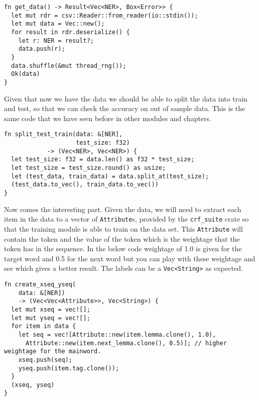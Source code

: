 \documentclass{book}
\begin{document}
\begin{lstlisting}[caption={chapter5\\/crfsuite\\-model\\/src\\/main\\.rs}, basicstyle=\small]
fn get_data() -> Result<Vec<NER>, Box<Error>> {
  let mut rdr = csv::Reader::from_reader(io::stdin());
  let mut data = Vec::new();
  for result in rdr.deserialize() {
    let r: NER = result?;
    data.push(r);
  }
  data.shuffle(&mut thread_rng());
  Ok(data)
}
\end{lstlisting}

Given that now we have the data we should be able to split the data into train and test, so that we can check the accuracy on out of sample data. This is the same code that we have seen before in other modules and chapters.

\begin{lstlisting}[caption={chapter5\\/crfsuite\\-model\\/src\\/main\\.rs}, basicstyle=\small]
fn split_test_train(data: &[NER],
                    test_size: f32)
		    -> (Vec<NER>, Vec<NER>) {
  let test_size: f32 = data.len() as f32 * test_size;
  let test_size = test_size.round() as usize;
  let (test_data, train_data) = data.split_at(test_size);
  (test_data.to_vec(), train_data.to_vec())
}
\end{lstlisting}

Now comes the interesting part. Given the data, we will need to extract each item in the data to a vector of \lstinline{Attribute}s, provided by the \lstinline{crf_suite} crate so that the training module is able to train on the data set. This \lstinline{Attribute} will contain the token and the value of the token which is the weightage that the token has in the sequence. In the below code weightage of 1.0 is given for the target word and 0.5 for the next word but you can play with these weightage and see which gives a better result. The labels can be a \lstinline{Vec<String>} as expected.

\begin{lstlisting}[caption={chapter5\\/crfsuite\\-model\\/src\\/main\\.rs}, basicstyle=\small]
fn create_xseq_yseq(
    data: &[NER])
    -> (Vec<Vec<Attribute>>, Vec<String>) {
  let mut xseq = vec![];
  let mut yseq = vec![];
  for item in data {
    let seq = vec![Attribute::new(item.lemma.clone(), 1.0),
      Attribute::new(item.next_lemma.clone(), 0.5)]; // higher weightage for the mainword.
    xseq.push(seq);
    yseq.push(item.tag.clone());
  }
  (xseq, yseq)
}
\end{lstlisting}
\end{document}
